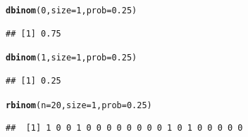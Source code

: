 \documentclass[handout]{beamer}\usepackage[]{graphicx}\usepackage[]{color}
\makeatletter
\newcommand{\hlnum}[1]{\textcolor[rgb]{0.686,0.059,0.569}{#1}}%
\newcommand{\hlstd}[1]{\textcolor[rgb]{0.345,0.345,0.345}{#1}}%
\newcommand{\hlkwc}[1]{\textcolor[rgb]{0.333,0.667,0.333}{#1}}%
\newcommand{\hlkwd}[1]{\textcolor[rgb]{0.737,0.353,0.396}{\textbf{#1}}}%
\newenvironment{kframe}{%
 \def\at@end@of@kframe{}%
 \ifinner\ifhmode%
  \def\at@end@of@kframe{\end{minipage}}%
  \begin{minipage}{\columnwidth}%
 \fi\fi%
 \def\FrameCommand##1{\hskip\@totalleftmargin \hskip-\fboxsep
 \colorbox{shadecolor}{##1}\hskip-\fboxsep
     \hskip-\linewidth \hskip-\@totalleftmargin \hskip\columnwidth}%
 \MakeFramed {\advance\hsize-\width
   \@totalleftmargin\z@ \linewidth\hsize
   \@setminipage}}%
 {\par\unskip\endMakeFramed%
 \at@end@of@kframe}
\newenvironment{knitrout}{}{} %
\theoremstyle{plain}
\theoremstyle{definition}
\makeatother
\begin{document}
\begin{frame}[fragile]

\begin{knitrout}
\color{fgcolor}\begin{kframe}
\begin{alltt}
\hlkwd{dbinom}\hlstd{(}\hlnum{0}\hlstd{,}\hlkwc{size}\hlstd{=}\hlnum{1}\hlstd{,}\hlkwc{prob}\hlstd{=}\hlnum{0.25}\hlstd{)}
\end{alltt}
\begin{verbatim}
## [1] 0.75
\end{verbatim}
\begin{alltt}
\hlkwd{dbinom}\hlstd{(}\hlnum{1}\hlstd{,}\hlkwc{size}\hlstd{=}\hlnum{1}\hlstd{,}\hlkwc{prob}\hlstd{=}\hlnum{0.25}\hlstd{)}
\end{alltt}
\begin{verbatim}
## [1] 0.25
\end{verbatim}
\begin{alltt}
\hlkwd{rbinom}\hlstd{(}\hlkwc{n}\hlstd{=}\hlnum{20}\hlstd{,}\hlkwc{size} \hlstd{=} \hlnum{1}\hlstd{,}\hlkwc{prob}\hlstd{=}\hlnum{0.25}\hlstd{)}
\end{alltt}
\begin{verbatim}
##  [1] 1 0 0 1 0 0 0 0 0 0 0 0 1 0 1 0 0 0 0 0
\end{verbatim}
\end{kframe}
\end{knitrout}

\end{frame}


\end{document}
